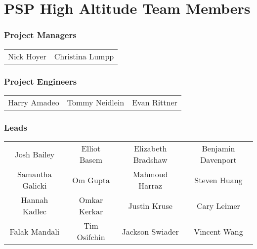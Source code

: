 \section{PSP High Altitude Team Members}

\subsubsection*{Project Managers}
\begin{table*}[htbp!]\small
    \centering
    \begin{tabular}{cc}
        Nick Hoyer & Christina Lumpp
    \end{tabular}
\end{table*}

\subsubsection*{Project Engineers}
\begin{table*}[htbp!]\small
    \centering
    \begin{tabular}{ccc}
        Harry Amadeo & Tommy Neidlein & Evan Rittner
    \end{tabular}
\end{table*}

\subsubsection*{Leads}
\begin{table*}[htbp!]\small
    \centering
    \begin{tabular}{cccc}
        Josh Bailey & Elliot Basem & Elizabeth Bradshaw & Benjamin Davenport \\
        Samantha Galicki & Om Gupta & Mahmoud Harraz & Steven Huang \\
        Hannah Kadlec & Omkar Kerkar & Justin Kruse & Cary Leimer \\
        Falak Mandali & Tim Osifchin & Jackson Swiader & Vincent Wang
    \end{tabular}
\end{table*}

